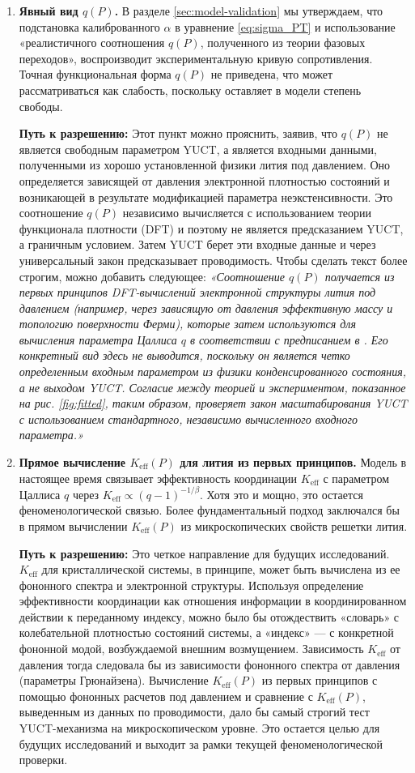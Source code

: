 \documentclass[12pt,a4paper]{article}
\theoremstyle{remark}
\newcommand{\Ke}{K_{\mathrm{eff}}}
\newcommand{\alp}{\alpha}
\begin{document}
\begin{enumerate}
		\item \textbf{Явный вид \(q(P)\).} В разделе \ref{sec:model-validation} мы утверждаем, что подстановка калиброванного \(\alp\) в уравнение \eqref{eq:sigma_PT} и использование «реалистичного соотношения \(q(P)\), полученного из теории фазовых переходов», воспроизводит экспериментальную кривую сопротивления. Точная функциональная форма \(q(P)\) не приведена, что может рассматриваться как слабость, поскольку оставляет в модели степень свободы.
		
		\textbf{Путь к разрешению:} Этот пункт можно прояснить, заявив, что \(q(P)\) не является свободным параметром YUCT, а является входными данными, полученными из хорошо установленной физики лития под давлением. Оно определяется зависящей от давления электронной плотностью состояний и возникающей в результате модификацией параметра неэкстенсивности. Это соотношение \(q(P)\) независимо вычисляется с использованием теории функционала плотности (DFT) и поэтому не является предсказанием YUCT, а граничным условием. Затем YUCT берет эти входные данные и через универсальный закон предсказывает проводимость. Чтобы сделать текст более строгим, можно добавить следующее: \textit{«Соотношение \(q(P)\) получается из первых принципов DFT-вычислений электронной структуры лития под давлением (например, через зависящую от давления эффективную массу и топологию поверхности Ферми), которые затем используются для вычисления параметра Цаллиса \(q\) в соответствии с предписанием в \cite{Tsallis2009}. Его конкретный вид здесь не выводится, поскольку он является четко определенным входным параметром из физики конденсированного состояния, а не выходом YUCT. Согласие между теорией и экспериментом, показанное на рис. \ref{fig:fitted}, таким образом, проверяет закон масштабирования YUCT с использованием стандартного, независимо вычисленного входного параметра.»}
		
		\item \textbf{Прямое вычисление \(\Ke(P)\) для лития из первых принципов.} Модель в настоящее время связывает эффективность координации \(\Ke\) с параметром Цаллиса \(q\) через \(\Ke \propto (q-1)^{-1/\beta}\). Хотя это и мощно, это остается феноменологической связью. Более фундаментальный подход заключался бы в прямом вычислении \(\Ke(P)\) из микроскопических свойств решетки лития.
		
		\textbf{Путь к разрешению:} Это четкое направление для будущих исследований. \(\Ke\) для кристаллической системы, в принципе, может быть вычислена из ее фононного спектра и электронной структуры. Используя определение эффективности координации как отношения информации в координированном действии к переданному индексу, можно было бы отождествить «словарь» с колебательной плотностью состояний системы, а «индекс» — с конкретной фононной модой, возбуждаемой внешним возмущением. Зависимость \(\Ke\) от давления тогда следовала бы из зависимости фононного спектра от давления (параметры Грюнайзена). Вычисление \(\Ke(P)\) из первых принципов с помощью фононных расчетов под давлением и сравнение с \(\Ke(P)\), выведенным из данных по проводимости, дало бы самый строгий тест YUCT-механизма на микроскопическом уровне. Это остается целью для будущих исследований и выходит за рамки текущей феноменологической проверки.
	\end{enumerate}
\end{document}
